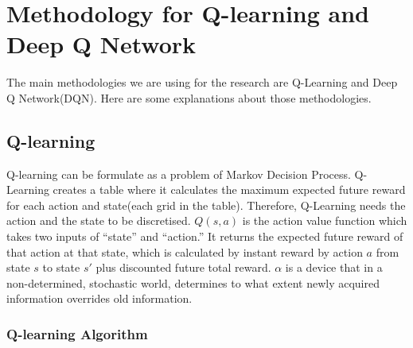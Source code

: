 \chapter{Methodology for Q-learning and Deep Q Network}
\label{Ch:methodology}

The main methodologies we are using for the research are Q-Learning and Deep Q Network(DQN). Here are some explanations about those methodologies.

\section{Q-learning}
Q-learning can be formulate as a problem of Markov Decision Process. Q-Learning creates a table where it calculates the maximum expected future reward for each action and state(each grid in the table). Therefore, Q-Learning needs the action and the state to be discretised. $Q(s,a)$ is the action value function which takes two inputs of “state” and “action.” It returns the expected future reward of that action at that state, which is calculated by instant reward by action $a$ from state $s$ to state $s'$ plus discounted future total reward. $\alpha$ is a device that in a non-determined, stochastic world, determines to what extent newly acquired information overrides old information.
\subsection{Q-learning Algorithm}
\def\skipl{0.2in}
\vspace{\skipl}
\vspace{\skipl}

